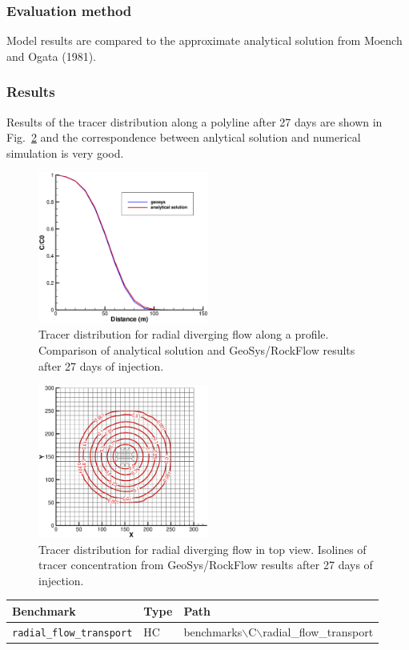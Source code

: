 \subsubsection*{Evaluation method}

Model results are compared to the approximate analytical solution from Moench and Ogata (1981).

\subsubsection*{Results}

Results of the tracer distribution along a polyline after 27 days are shown in Fig.~\ref{radial_flow_tracer_distibution} and the correspondence between anlytical solution and numerical simulation is very good.


\begin{figure}[htbp]
\centering
\includegraphics[width=0.5\textwidth]{C/figures/HC_RadialTransport_profile.eps}
\caption{Tracer distribution for radial diverging flow along a profile. Comparison of analytical solution and GeoSys/RockFlow results after 27 days of injection.}
\label{radial_flow_tracer_distibution}
\end{figure}



\begin{figure}[htbp]
\centering
\includegraphics[width=0.5\textwidth]{C/figures/HC_RadialTransport_domain.eps}
\caption{Tracer distribution for radial diverging flow in top view. Isolines of tracer concentration from GeoSys/RockFlow results after 27 days of injection.}
\label{radial_flow_tracer_distibution}
\end{figure}


\begin{table}[htbp]
\centering
\begin{tabular}{|l|l|l|}
\hline
Benchmark & Type & Path \\
\hline
\texttt{radial\_flow\_transport}& HC &  benchmarks$\backslash$C$\backslash$radial\_flow\_transport  \\			
\hline
\end{tabular}
\end{table}
